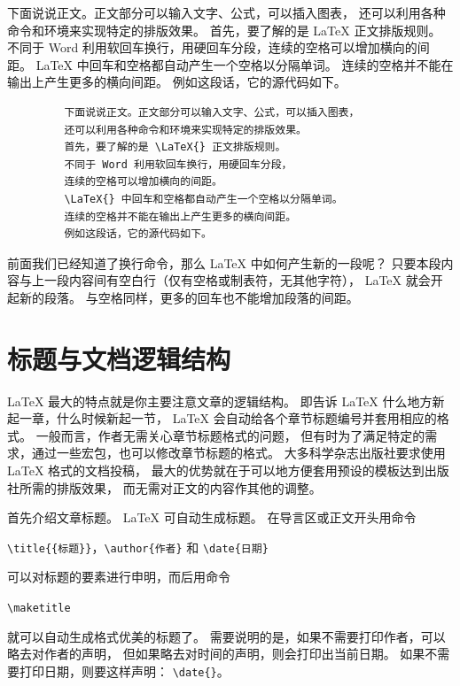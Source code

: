 下面说说正文。正文部分可以输入文字、公式，可以插入图表，
还可以利用各种命令和环境来实现特定的排版效果。
首先，要了解的是 \LaTeX{} 正文排版规则。
不同于 Word 利用软回车换行，用硬回车分段，连续的空格可以增加横向的间距。
\LaTeX{} 中回车和空格都自动产生一个空格以分隔单词。
连续的空格并不能在输出上产生更多的横向间距。
例如这段话，它的源代码如下。

{\small%
\begin{verbatim}
         下面说说正文。正文部分可以输入文字、公式，可以插入图表，
         还可以利用各种命令和环境来实现特定的排版效果。
         首先，要了解的是 \LaTeX{} 正文排版规则。
         不同于 Word 利用软回车换行，用硬回车分段，
         连续的空格可以增加横向的间距。
         \LaTeX{} 中回车和空格都自动产生一个空格以分隔单词。
         连续的空格并不能在输出上产生更多的横向间距。
         例如这段话，它的源代码如下。
\end{verbatim}}

前面我们已经知道了换行命令，那么 \LaTeX{} 中如何产生新的一段呢？
只要本段内容与上一段内容间有空白行（仅有空格或制表符，无其他字符），
\LaTeX{} 就会开起新的段落。
与空格同样，更多的回车也不能增加段落的间距。


\section{标题与文档逻辑结构}

\LaTeX{} 最大的特点就是你主要注意文章的逻辑结构。
即告诉 \LaTeX{} 什么地方新起一章，什么时候新起一节，
\LaTeX{} 会自动给各个章节标题编号并套用相应的格式。
一般而言，作者无需关心章节标题格式的问题，
但有时为了满足特定的需求，通过一些宏包，也可以修改章节标题的格式。
大多科学杂志出版社要求使用 \LaTeX{} 格式的文档投稿，
最大的优势就在于可以地方便套用预设的模板达到出版社所需的排版效果，
而无需对正文的内容作其他的调整。

首先介绍文章标题。
\LaTeX{} 可自动生成标题。
在导言区或正文开头用命令
\begin{center}
  \verb|\title{{标题}}|，\verb|\author{作者}| 和 \verb|\date{日期}|
\end{center}
可以对标题的要素进行申明，而后用命令
\begin{center}
  \verb|\maketitle|
\end{center}
就可以自动生成格式优美的标题了。
需要说明的是，如果不需要打印作者，可以略去对作者的声明，
但如果略去对时间的声明，则会打印出当前日期。
如果不需要打印日期，则要这样声明： \verb|\date{}|。

